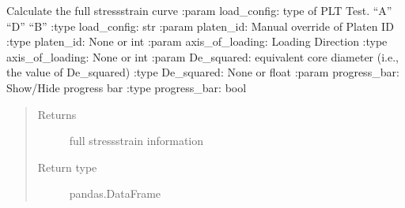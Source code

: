 \documentclass[letterpaper,10pt,english]{sphinxmanual}
\begin{document}
\begin{fulllineitems}
\begin{fulllineitems}
\end{fulllineitems}


\begin{fulllineitems}
\label{\detokenize{openfdem:openfdem.openfdem.Model.complete_PLT_stress_strain}}
Calculate the full stress\sphinxhyphen{}strain curve
:param load\_config: type of PLT Test. “A” “D” “B”
:type load\_config: str
:param platen\_id: Manual override of Platen ID
:type platen\_id: None or int
:param axis\_of\_loading: Loading Direction
:type axis\_of\_loading: None or int
:param De\_squared: equivalent core diameter (i.e., the value of De\_squared)
:type De\_squared: None or float
:param progress\_bar: Show/Hide progress bar
:type progress\_bar: bool
\begin{quote}\begin{description}
\item[{Returns}] \leavevmode
full stress\sphinxhyphen{}strain information

\item[{Return type}] \leavevmode
pandas.DataFrame


\end{description}
\end{quote}
\end{fulllineitems}
\end{fulllineitems}
\end{document}
